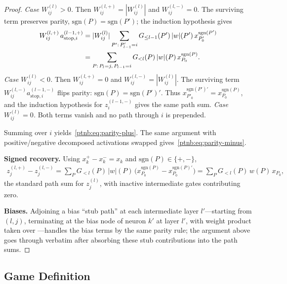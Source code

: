 \begin{proof}
\emph{Case $W^{(l)}_{ij} > 0$.} Then $W_{ij}^{(l,+)} = |W^{(l)}_{ij}|$ and $W_{ij}^{(l,-)} = 0$.
The surviving term preserves parity, $\mathrm{sgn}(P) = \mathrm{sgn}(P')$; the induction hypothesis gives
\begin{align}
    W_{ij}^{(l,+)}\, a_{\mathrm{stop},i}^{(l-1,+)}
    &= |W^{(l)}_{ij}| \sum_{P':\, P'_{l-1} = i} G_{\le l-1}(P')\, |w|(P')\, x_{P'_0}^{\mathrm{sgn}(P')}
    \notag\\
    &= \sum_{P:\, P_l = j,\, P_{l-1} = i} G_{<l}(P)\, |w|(P)\, x_{P_0}^{\mathrm{sgn}(P)}.
\end{align}
\emph{Case $W^{(l)}_{ij} < 0$.} Then $W_{ij}^{(l,+)} = 0$ and $W_{ij}^{(l,-)} = |W^{(l)}_{ij}|$.
The surviving term $W_{ij}^{(l,-)}a_{\mathrm{stop},i}^{(l-1,-)}$ flips parity:
$\mathrm{sgn}(P)=\mathrm{sgn}(P')'$. Thus $x_{P'_0}^{\mathrm{sgn}(P')'}=x_{P_0}^{\mathrm{sgn}(P)}$,
and the induction hypothesis for $z_i^{(l-1,-)}$ gives the same path sum.
\emph{Case $W^{(l)}_{ij} = 0$.} Both terms vanish and no path through $i$ is prepended.

Summing over $i$ yields~\eqref{ptnb:eq:parity-plus}. The same argument with positive/negative decomposed
activations swapped gives~\eqref{ptnb:eq:parity-minus}.

\textbf{Signed recovery.} Using $x_k^+ - x_k^- = x_k$ and $\mathrm{sgn}(P) \in \{+,-\}$,
\begin{align}
    z_j^{(l,+)} - z_j^{(l,-)}
    = \sum_P G_{<l}(P)\, |w|(P)\, \bigl(x_{P_0}^{\mathrm{sgn}(P)} - x_{P_0}^{\mathrm{sgn}(P)'}\bigr)
    = \sum_P G_{<l}(P)\, w(P)\, x_{P_0},
\end{align}
the standard path sum for $z_j^{(l)}$, with inactive intermediate gates contributing zero.

\textbf{Biases.} Adjoining a bias ``stub path'' at each intermediate layer $l'$---starting from
$(l,j)$, terminating at the bias node of neuron $k'$ at layer $l'$, with weight product taken over ---handles the
bias terms by the same parity rule; the argument above goes through verbatim
after absorbing these stub contributions into the path sums.
\end{proof}

\subsection{Game Definition}\label{ptnb:app:adf-game-def}\label{sec:shapley_bellman_recursion}\label{ptnb:app:adf-recursion}


